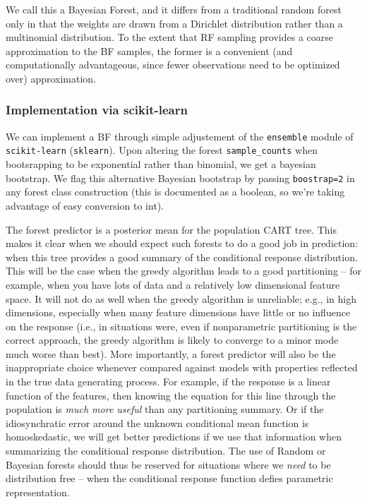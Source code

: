 \documentclass{article}
\begin{document}
We call this a Bayesian Forest, and it differs from a traditional random
forest only in that the weights are drawn from a Dirichlet distribution
rather than a multinomial distribution. To the extent that RF sampling
provides a coarse approximation to the BF samples, the former is a
convenient (and computationally advantageous, since fewer observations
need to be optimized over) approximation.

    \subsubsection{Implementation via
scikit-learn}\label{implementation-via-scikit-learn}

We can implement a BF through simple adjustement of the
\texttt{ensemble} module of \texttt{scikit-learn} (\texttt{sklearn}).
Upon altering the forest \texttt{sample\_counts} when bootsrapping to be
exponential rather than binomial, we get a bayesian bootstrap. We flag
this alternative Bayesian bootstrap by passing \texttt{boostrap=2} in
any forest class construction (this is documented as a boolean, so we're
taking advantage of easy conversion to int).


The forest predictor is a posterior mean for the population CART tree.  This makes it clear when we should expect such forests to do a good job in prediction: when this tree provides a good summary of the conditional response distribution.  This will be the case when the greedy algorithm leads to a good partitioning -- for example, when you have lots of data and a relatively low dimensional feature space.  It will not do as well when the greedy algorithm is unreliable; e.g., in high dimensions, especially when many feature dimensions have little or no influence on the response (i.e., in situations were, even if nonparametric partitioning is the correct approach, the greedy algorithm is likely to converge to a minor mode much worse than best).  More importantly, a forest predictor will also be the inappropriate choice whenever compared against models with properties reflected in the true data generating process.  For example, if the response is a linear function of the features, then knowing the equation for this line through the population is \emph{much more useful} than any partitioning summary.  Or if the idiosynchratic error around the unknown conditional mean function is homoskedastic, we will get better predictions if we use that information when summarizing the conditional response distribution.  The use of Random or Bayesian forests should thus be reserved for situations where we \emph{need} to be distribution free -- when the conditional response function defies parametric representation. 
\end{document}
